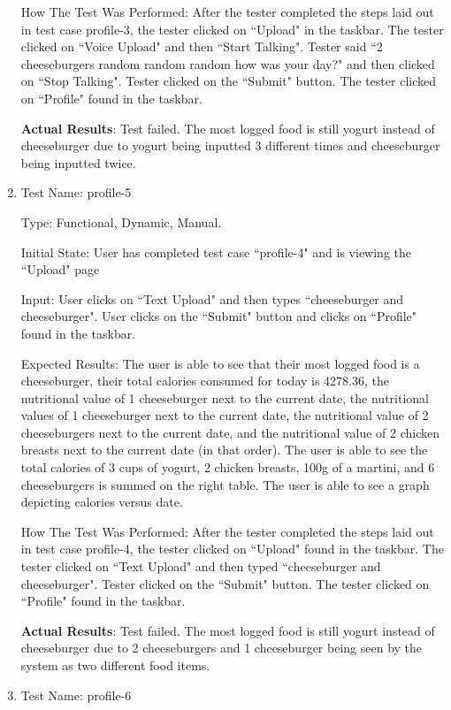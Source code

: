 \documentclass[12pt, titlepage]{article}
\begin{document}
\begin{enumerate}
		How The Test Was Performed: After the tester completed the steps laid out in test case profile-3, the tester clicked on ``Upload" in the taskbar. The tester clicked on ``Voice Upload" and then ``Start Talking". Tester said ``2 cheeseburgers random random random how was your day?" and then clicked on ``Stop Talking". Tester clicked on the ``Submit" button. The tester clicked on ``Profile" found in the taskbar.
		
		\textbf{Actual Results}: Test failed. The most logged food is still yogurt instead of cheeseburger due to yogurt being inputted 3 different times and cheeseburger being inputted twice.
		
		\item{Test Name: profile-5}
		
		Type: Functional, Dynamic, Manual.
		
		Initial State: User has completed test case ``profile-4" and is viewing the ``Upload" page
		
		Input: User clicks on ``Text Upload" and then types ``cheeseburger and cheeseburger". User clicks on the ``Submit" button and clicks on ``Profile" found in the taskbar.
		
		Expected Results: The user is able to see that their most logged food is a cheeseburger, their total calories consumed for today is 4278.36, the nutritional value of 1 cheeseburger next to the current date, the nutritional values of 1 cheeseburger next to the current date, the nutritional value of 2 cheeseburgers next to the current date, and the nutritional value of 2 chicken breasts next to the current date (in that order). The user is able to see the total calories of 3 cups of yogurt, 2 chicken breasts, 100g of a martini, and 6 cheeseburgers is summed on the right table. The user is able to see a graph depicting calories versus date.
		
		How The Test Was Performed: After the tester completed the steps laid out in test case profile-4, the tester clicked on ``Upload" found in the taskbar. The tester clicked on ``Text Upload" and then typed ``cheeseburger and cheeseburger". Tester clicked on the ``Submit" button. The tester clicked on ``Profile" found in the taskbar.
		
		\textbf{Actual Results}: Test failed. The most logged food is still yogurt instead of cheeseburger due to 2 cheeseburgers and 1 cheeseburger being seen by the system as two different food items.
		
		\item{Test Name: profile-6}
		

\end{enumerate}
\end{document}
